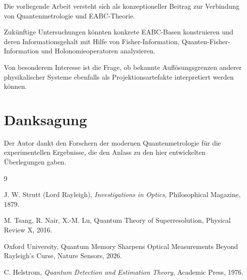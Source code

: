\documentclass[11pt,a4paper]{article}
\theoremstyle{remark}
\begin{document}
	Die vorliegende Arbeit versteht sich als konzeptioneller Beitrag zur
	Verbindung von Quantenmetrologie und EABC-Theorie.
	
	Zukünftige Untersuchungen könnten konkrete EABC-Basen konstruieren und
	deren Informationsgehalt mit Hilfe von Fisher-Information,
	Quanten-Fisher-Information und Holonomieoperatoren analysieren.
	
	Von besonderem Interesse ist die Frage, ob bekannte
	Auflösungsgrenzen anderer physikalischer Systeme ebenfalls als
	Projektionsartefakte interpretiert werden können.
	
	\section*{Danksagung}
	
	Der Autor dankt den Forschern der modernen Quantenmetrologie für die
	experimentellen Ergebnisse, die den Anlass zu den hier entwickelten
	Überlegungen gaben.
	
	\begin{thebibliography}{9}
		
		J. W. Strutt (Lord Rayleigh),
		\emph{Investigations in Optics},
		Philosophical Magazine,
		1879.
		
		M. Tsang, R. Nair, X.-M. Lu,
		Quantum Theory of Superresolution,
		Physical Review X,
		2016.
		
		Oxford University,
		Quantum Memory Sharpens Optical Measurements Beyond Rayleigh's Curse,
		Nature Sensors,
		2026.
		
		C. Helstrom,
		\emph{Quantum Detection and Estimation Theory},
		Academic Press,
		1976.
		
	\end{thebibliography}
	
\end{document}
